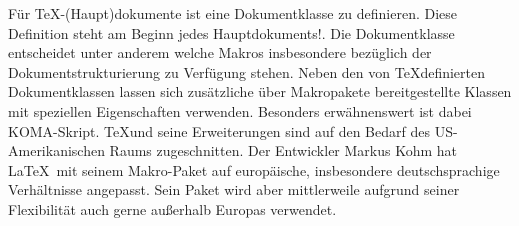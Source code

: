 \renewcommand*{\authorOfNextLines}{Helmut Quinz}
Für \TeX -(Haupt)dokumente ist eine Dokumentklasse zu definieren.
Diese Definition steht am Beginn jedes Hauptdokuments!.
Die Dokumentklasse entscheidet unter anderem welche Makros insbesondere bezüglich der Dokumentstrukturierung zu Verfügung stehen.
Neben den von \TeX definierten Dokumentklassen lassen sich zusätzliche über Makropakete bereitgestellte Klassen mit speziellen Eigenschaften verwenden.
Besonders erwähnenswert ist dabei KOMA-Skript. 
\TeX und seine Erweiterungen sind auf den Bedarf des US-Amerikanischen Raums zugeschnitten. 
Der Entwickler Markus Kohm hat \LaTeX ~mit seinem Makro-Paket auf europäische, insbesondere deutschsprachige Verhältnisse angepasst.
Sein Paket wird aber mittlerweile aufgrund seiner Flexibilität auch gerne außerhalb Europas verwendet.\\

